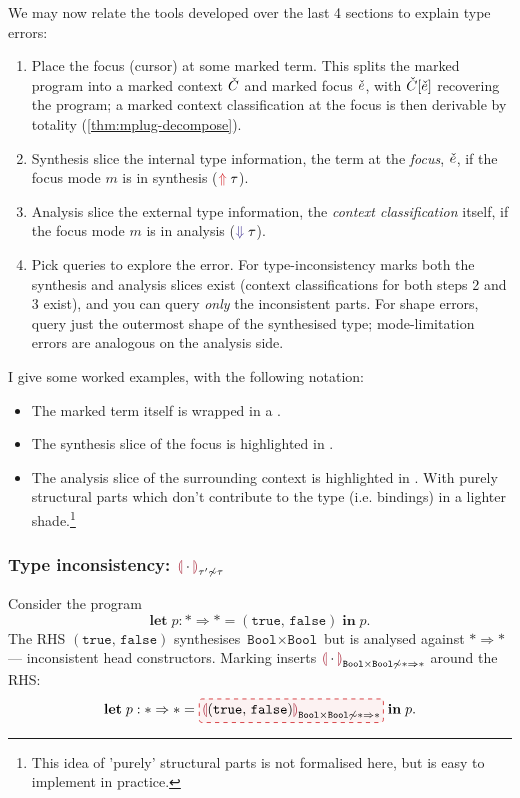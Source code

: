 We may now relate the tools developed over the last 4 sections to explain type errors:
\begin{enumerate}
\item Place the focus (cursor) at some marked term. This splits the marked program into a marked context $\check{C}$ and marked focus $\check{e}$, with $\check{C}[\check{e}]$ recovering the program; a marked context classification at the focus is then derivable by totality (\cref{thm:mplug-decompose}).
\item Synthesis slice the internal type information, the term at the \emph{focus}, $\check{e}$, if the focus mode $m$ is in synthesis (${\color{BrickRed}\Uparrow}\;\tau$).
\item Analysis slice the external type information, the \emph{context classification} itself, if the focus mode $m$ is in analysis (${\color{BlueViolet}\Downarrow}\;\tau$).
\item Pick queries to explore the error. For type-inconsistency marks both the synthesis and analysis slices exist (context classifications for both steps 2 and 3 exist), and you can query \textit{only} the inconsistent parts. For shape errors, query just the outermost shape of the synthesised type; mode-limitation errors are analogous on the analysis side.
\end{enumerate}

I give some worked examples, with the following notation:
\begin{itemize}
\item The marked term itself is wrapped in a .
\item The synthesis slice of the focus is highlighted in .
\item The analysis slice of the surrounding context is highlighted in . With purely structural parts which don't contribute to the type (i.e. bindings) in a lighter shade.\footnote{This idea of 'purely' structural parts is not formalised here, but is easy to implement in practice.}
\end{itemize}

\subsubsection{Type inconsistency: \texorpdfstring{$\markincon{\tau'}{\tau}$}{type inconsistency}}
\label{sec:marking-recipes-incon}

Consider the program
\[
  \mathbf{let}\;p : * \Rightarrow * = (\texttt{true},\,\texttt{false})\;\mathbf{in}\;p.
\]
The RHS $(\texttt{true},\,\texttt{false})$ synthesises $\texttt{Bool} \times \texttt{Bool}$ but is analysed against $* \Rightarrow *$ --- inconsistent head constructors. Marking inserts
$\markincon{\texttt{Bool} \times \texttt{Bool}}{* \Rightarrow *}$
around the RHS:
\[
  \mathbf{let}\;p : * \Rightarrow * = \markbox{\markincon[(\texttt{true},\,\texttt{false})]{\texttt{Bool} \times \texttt{Bool}}{* \Rightarrow *}}\;\mathbf{in}\;p.
\]


